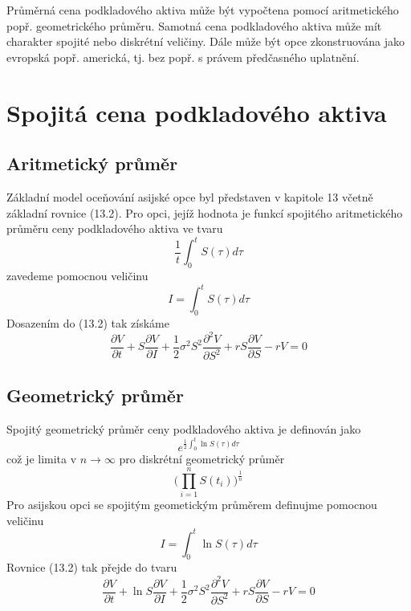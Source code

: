 \documentclass[a4paper]{book}
\begin{document}
Průměrná cena podkladového aktiva může být vypočtena pomocí aritmetického popř. geometrického průměru. Samotná cena podkladového aktiva může mít charakter spojité nebo diskrétní veličiny. Dále může být opce zkonstruována jako evropská popř. americká, tj. bez popř. s právem předčasného uplatnění.

\section{Spojitá cena podkladového aktiva}

\subsection{Aritmetický průměr}

Základní model oceňování asijské opce byl představen v kapitole 13 včetně základní rovnice (13.2). Pro opci, jejíž hodnota je funkcí spojitého aritmetického průměru ceny podkladového aktiva ve tvaru
\begin{equation*}
\frac{1}{t} \int_0^t S(\tau) d \tau
\end{equation*}
zavedeme pomocnou veličinu
\begin{equation*}
I = \int_0^t S(\tau) d \tau
\end{equation*}
Dosazením do (13.2) tak získáme
\begin{equation*}
\frac{\partial V}{\partial t} + S \frac{\partial V}{\partial I} + \frac{1}{2} \sigma^2 S^2 \frac{\partial^2 V}{\partial S^2} + r S \frac{\partial V}{\partial S} - rV = 0
\end{equation*}

\subsection{Geometrický průměr}

Spojitý geometrický průměr ceny podkladového aktiva je definován jako
\begin{equation*}
e^{\frac{1}{2}\int_0^t \ln S(\tau) d \tau}
\end{equation*}
což je limita v $n \rightarrow \infty$ pro diskrétní geometrický průměr
\begin{equation*}
\Big( \prod\limits_{i = 1}^{n} S(t_i)\Big)^{\frac{1}{n}}
\end{equation*}
Pro asijskou opci se spojitým geometickým průměrem definujme pomocnou veličinu
\begin{equation*}
I = \int_0^t \ln S(\tau) d \tau
\end{equation*}
Rovnice (13.2) tak přejde do tvaru
\begin{equation*}
\frac{\partial V}{\partial t} + \ln S \frac{\partial V}{\partial I} + \frac{1}{2} \sigma^2 S^2 \frac{\partial^2 V}{\partial S^2} + r S \frac{\partial V}{\partial S} - rV = 0
\end{equation*}
\end{document}
